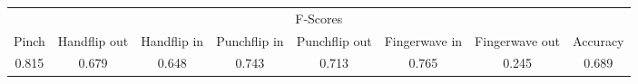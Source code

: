 \documentclass{standalone}
\begin{document}
 
 \begin{tabular}{|c|c|c|c|c|c|c ||c|}
\cline{1-8}\multicolumn{8}{|c|}{F-Scores} \\ 
\cline{1-8}Pinch & Handflip out & Handflip in & Punchflip in & Punchflip out & Fingerwave in & Fingerwave out & Accuracy\\ 
\cline{1-8}0.815 & 0.679 & 0.648 & 0.743 & 0.713 & 0.765 & 0.245 & 0.689\\ 
 \cline{1-8}\hline \end{tabular}
 
\end{document}
